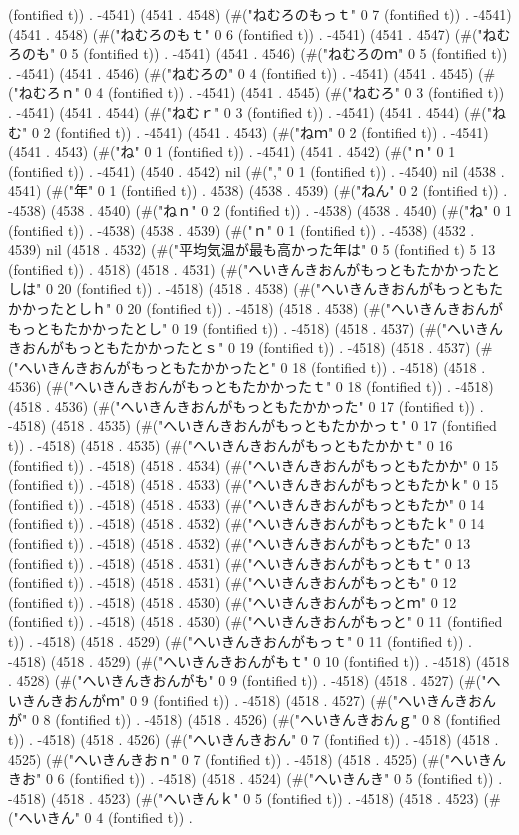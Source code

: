 (fontified t)) . -4541) (4541 . 4548) (#("ねむろのもっｔ" 0 7 (fontified t)) . -4541) (4541 . 4548) (#("ねむろのもｔ" 0 6 (fontified t)) . -4541) (4541 . 4547) (#("ねむろのも" 0 5 (fontified t)) . -4541) (4541 . 4546) (#("ねむろのｍ" 0 5 (fontified t)) . -4541) (4541 . 4546) (#("ねむろの" 0 4 (fontified t)) . -4541) (4541 . 4545) (#("ねむろｎ" 0 4 (fontified t)) . -4541) (4541 . 4545) (#("ねむろ" 0 3 (fontified t)) . -4541) (4541 . 4544) (#("ねむｒ" 0 3 (fontified t)) . -4541) (4541 . 4544) (#("ねむ" 0 2 (fontified t)) . -4541) (4541 . 4543) (#("ねｍ" 0 2 (fontified t)) . -4541) (4541 . 4543) (#("ね" 0 1 (fontified t)) . -4541) (4541 . 4542) (#("ｎ" 0 1 (fontified t)) . -4541) (4540 . 4542) nil (#("," 0 1 (fontified t)) . -4540) nil (4538 . 4541) (#("年" 0 1 (fontified t)) . 4538) (4538 . 4539) (#("ねん" 0 2 (fontified t)) . -4538) (4538 . 4540) (#("ねｎ" 0 2 (fontified t)) . -4538) (4538 . 4540) (#("ね" 0 1 (fontified t)) . -4538) (4538 . 4539) (#("ｎ" 0 1 (fontified t)) . -4538) (4532 . 4539) nil (4518 . 4532) (#("平均気温が最も高かった年は" 0 5 (fontified t) 5 13 (fontified t)) . 4518) (4518 . 4531) (#("へいきんきおんがもっともたかかったとしは" 0 20 (fontified t)) . -4518) (4518 . 4538) (#("へいきんきおんがもっともたかかったとしｈ" 0 20 (fontified t)) . -4518) (4518 . 4538) (#("へいきんきおんがもっともたかかったとし" 0 19 (fontified t)) . -4518) (4518 . 4537) (#("へいきんきおんがもっともたかかったとｓ" 0 19 (fontified t)) . -4518) (4518 . 4537) (#("へいきんきおんがもっともたかかったと" 0 18 (fontified t)) . -4518) (4518 . 4536) (#("へいきんきおんがもっともたかかったｔ" 0 18 (fontified t)) . -4518) (4518 . 4536) (#("へいきんきおんがもっともたかかった" 0 17 (fontified t)) . -4518) (4518 . 4535) (#("へいきんきおんがもっともたかかっｔ" 0 17 (fontified t)) . -4518) (4518 . 4535) (#("へいきんきおんがもっともたかかｔ" 0 16 (fontified t)) . -4518) (4518 . 4534) (#("へいきんきおんがもっともたかか" 0 15 (fontified t)) . -4518) (4518 . 4533) (#("へいきんきおんがもっともたかｋ" 0 15 (fontified t)) . -4518) (4518 . 4533) (#("へいきんきおんがもっともたか" 0 14 (fontified t)) . -4518) (4518 . 4532) (#("へいきんきおんがもっともたｋ" 0 14 (fontified t)) . -4518) (4518 . 4532) (#("へいきんきおんがもっともた" 0 13 (fontified t)) . -4518) (4518 . 4531) (#("へいきんきおんがもっともｔ" 0 13 (fontified t)) . -4518) (4518 . 4531) (#("へいきんきおんがもっとも" 0 12 (fontified t)) . -4518) (4518 . 4530) (#("へいきんきおんがもっとｍ" 0 12 (fontified t)) . -4518) (4518 . 4530) (#("へいきんきおんがもっと" 0 11 (fontified t)) . -4518) (4518 . 4529) (#("へいきんきおんがもっｔ" 0 11 (fontified t)) . -4518) (4518 . 4529) (#("へいきんきおんがもｔ" 0 10 (fontified t)) . -4518) (4518 . 4528) (#("へいきんきおんがも" 0 9 (fontified t)) . -4518) (4518 . 4527) (#("へいきんきおんがｍ" 0 9 (fontified t)) . -4518) (4518 . 4527) (#("へいきんきおんが" 0 8 (fontified t)) . -4518) (4518 . 4526) (#("へいきんきおんｇ" 0 8 (fontified t)) . -4518) (4518 . 4526) (#("へいきんきおん" 0 7 (fontified t)) . -4518) (4518 . 4525) (#("へいきんきおｎ" 0 7 (fontified t)) . -4518) (4518 . 4525) (#("へいきんきお" 0 6 (fontified t)) . -4518) (4518 . 4524) (#("へいきんき" 0 5 (fontified t)) . -4518) (4518 . 4523) (#("へいきんｋ" 0 5 (fontified t)) . -4518) (4518 . 4523) (#("へいきん" 0 4 (fontified t)) . 